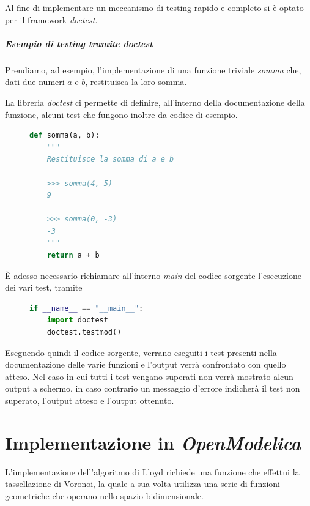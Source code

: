 \documentclass[11pt,a4paper]{report}
\begin{document}
Al fine di implementare un meccanismo di testing rapido e completo si è optato per il framework \textit{doctest}.

\paragraph{Esempio di testing tramite \textit{doctest}}

Prendiamo, ad esempio, l'implementazione di una funzione triviale \textit{somma} che, dati due numeri $a$ e $b$, restituisca la loro somma.

La libreria \textit{doctest} ci permette di definire, all'interno della documentazione della funzione, alcuni test che fungono inoltre da codice di esempio.

\begin{figure}[H]
\begin{lstlisting}[language=Python]
def somma(a, b):
	"""
	Restituisce la somma di a e b
	
	>>> somma(4, 5)
	9
	
	>>> somma(0, -3)
	-3
	"""
	return a + b
\end{lstlisting}
\end{figure}

È adesso necessario richiamare all'interno \textit{main} del codice sorgente l'esecuzione dei vari test, tramite

\begin{figure}[H]
\begin{lstlisting}[language=Python]
if __name__ == "__main__":
    import doctest
    doctest.testmod()
\end{lstlisting}
\end{figure}

Eseguendo quindi il codice sorgente, verrano eseguiti i test presenti nella documentazione delle varie funzioni e l'output verrà confrontato con quello atteso. Nel caso in cui tutti i test vengano superati non verrà mostrato alcun output a schermo, in caso contrario un messaggio d'errore indicherà il test non superato, l'output atteso e l'output ottenuto.

\pagebreak

\chapter{Implementazione in \textit{OpenModelica}}

L'implementazione dell'algoritmo di Lloyd richiede una funzione che effettui la tassellazione di Voronoi, la quale a sua volta utilizza una serie di funzioni geometriche che operano nello spazio bidimensionale.
\end{document}
